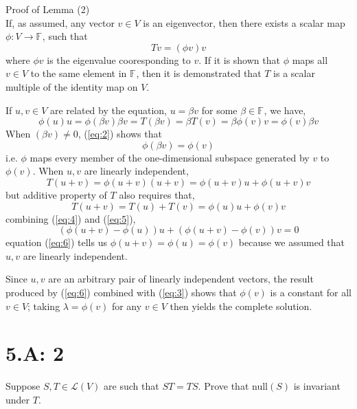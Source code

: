\documentclass[
	12pt, %
]{fphw}
\newcommand\0{\mathbf{0}}
\newcommand\qed{\text{$\blacksquare$}}
\newcommand\F[1]{\text{$\mathbb{F}^{#1}$}}
\renewcommand\L[1]{\mathcal{L}(#1)}
\begin{document}
\vspace{10 pt}
Proof of Lemma (2)\\
If, as assumed, any vector $v \in V$ is an eigenvector, then there exists a scalar map $\phi : V \to \F{}$, such that
\begin{equation}
Tv = (\phi v) v
\end{equation}
where $\phi v$ is the eigenvalue cooresponding to $v$. If it is shown that $\phi$ maps all $v \in V$ to the same element in $\F{}$, then it is demonstrated that $T$ is a scalar multiple of the identity map on $V$.

If $u, v \in V$ are related by the equation, $u = \beta v$ for some $\beta \in \F{}$, we have,
\begin{equation} \label{eq:2}
\phi(u)u = \phi(\beta v) \beta v = T(\beta v) = \beta T(v) = \beta \phi(v) v = \phi(v) \beta v
\end{equation}
When $(\beta v) \ne 0$, (\ref{eq:2}) shows that
\begin{equation} \label{eq:3}
\phi(\beta v) = \phi(v)
\end{equation}
i.e. $\phi$ maps every member of the one-dimensional subspace generated by $v$ to $\phi(v)$. When $u, v$ are linearly independent,
\begin{equation} \label{eq:4}
T(u + v) = \phi(u + v)(u + v) = \phi(u + v)u + \phi(u + v)v
\end{equation}
but additive property of $T$ also requires that,
\begin{equation} \label{eq:5}
T(u + v) = T(u) + T(v) = \phi(u)u + \phi(v)v
\end{equation}
combining (\ref{eq:4}) and (\ref{eq:5}),
\begin{equation} \label{eq:6}
(\phi(u + v) - \phi(u))u + (\phi(u + v)-\phi(v))v = 0
\end{equation}
equation (\ref{eq:6}) tells us $\phi(u + v) = \phi(u) = \phi(v)$ because we assumed that $u, v$ are linearly independent.

Since $u,v$ are an arbitrary pair of linearly independent vectors, the result produced by (\ref{eq:6}) combined with (\ref{eq:3}) shows that $\phi(v)$ is a constant for all $v \in V$; taking $\lambda = \phi(v)$ for any $v \in V$ then yields the complete solution. \qed
\newpage


\section*{5.A: 2}
\begin{problem}
Suppose $S, T \in \L{V}$ are such that $ST = TS$. Prove that null$(S)$ is invariant under $T$.
\end{problem}
\end{document}

